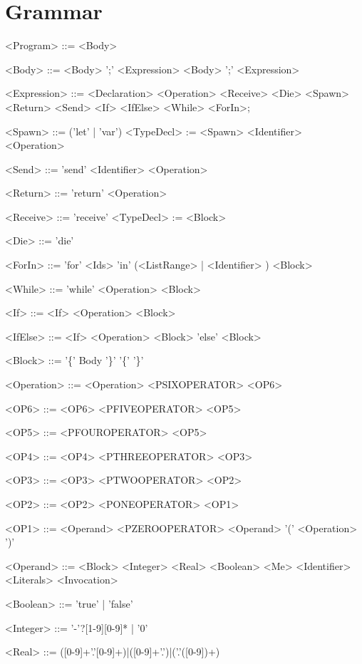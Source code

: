 \section{Grammar}
\setlength{\grammarindent}{100pt}
\begin{grammar}
<Program> ::= <Body>

<Body> ::= <Body> ';' <Expression>
 \alt <Body> ';'
 \alt <Expression>

<Expression> ::= <Declaration>
 \alt <Operation>
 \alt <Receive>
 \alt <Die>
 \alt <Spawn>
 \alt <Return>
 \alt <Send>
 \alt <If>
 \alt <IfElse>
 \alt <While>
 \alt <ForIn>;

<Spawn> ::= ('let' | 'var') <TypeDecl> := <Spawn> <Identifier> <Operation>

<Send> ::= 'send' <Identifier> <Operation>

<Return> ::= 'return' <Operation>

<Receive> ::= 'receive' <TypeDecl> := <Block>

<Die> ::= 'die'

<ForIn> ::= 'for' <Ids> 'in' (<ListRange> | <Identifier> ) <Block>

<While> ::= 'while' <Operation> <Block>

<If> ::= <If> <Operation> <Block>

<IfElse> ::= <If> <Operation> <Block> 'else' <Block>

<Block> ::= '\{' Body '\}'
 \alt '\{' '\}'

<Operation> ::= <Operation> <PSIXOPERATOR> <OP6>

<OP6> ::= <OP6> <PFIVEOPERATOR> <OP5>

<OP5> ::= <PFOUROPERATOR> <OP5>

<OP4> ::= <OP4> <PTHREEOPERATOR> <OP3>

<OP3> ::= <OP3> <PTWOOPERATOR> <OP2>

<OP2> ::= <OP2> <PONEOPERATOR> <OP1>

<OP1> ::= <Operand>
  <PZEROOPERATOR> <Operand>
 \alt '(' <Operation> ')'

<Operand>	::= <Block>
 \alt <Integer>
 \alt <Real>
 \alt <Boolean>
 \alt <Me>
 \alt <Identifier>
 \alt <Literals>
 \alt <Invocation>

<Boolean> ::= 'true' | 'false'

<Integer> ::= '-'?[1-9][0-9]* | '0'

<Real> ::= ([0-9]+'.'[0-9]+)|([0-9]+'.')|('.'([0-9])+)
    

\end{grammar}

